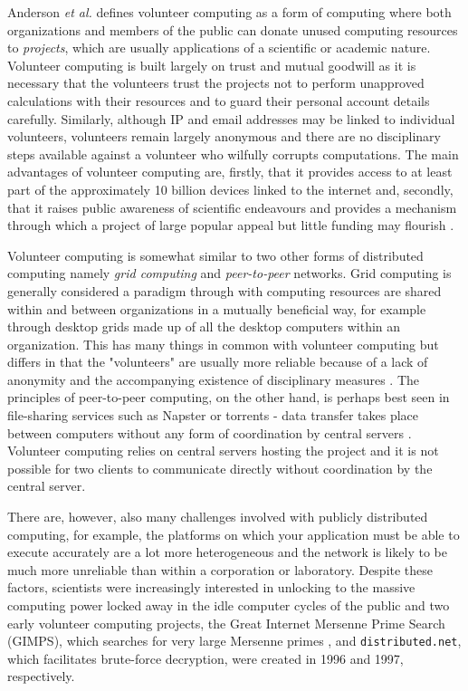 Anderson \emph{et al.} \cite{boincwiki} defines volunteer computing as a form of computing where both organizations and members of the public can donate unused computing resources to \emph{projects}, which are usually applications of a scientific or academic nature. Volunteer computing is built largely on trust and mutual goodwill as it is necessary that the volunteers trust the projects not to perform unapproved calculations with their resources and to guard their personal account details carefully. Similarly, although IP and email addresses may be linked to individual volunteers, volunteers remain largely anonymous and there are no disciplinary steps available against a volunteer who wilfully corrupts computations. The main advantages of volunteer computing are, firstly, that it provides access to at least part of the approximately 10 billion devices linked to the internet \cite{anderson2013,cisco} and, secondly, that it raises public awareness of scientific endeavours and provides a mechanism through which a project of large popular appeal but little funding may flourish \cite{boincwiki}.

Volunteer computing is somewhat similar to two other forms of distributed computing namely \emph{grid computing} and \emph{peer-to-peer} networks. Grid computing is generally considered a paradigm through with computing resources are shared within and between organizations in a mutually beneficial way, for example through desktop grids made up of  all the desktop computers within an organization. This has many things in common with volunteer computing but differs in that the "volunteers" are usually more reliable because of a lack of anonymity and the accompanying existence of disciplinary measures \cite{boincwiki, fostergrid}. The principles of peer-to-peer computing, on the other hand, is  perhaps best seen in file-sharing services such as Napster or torrents - data transfer takes place between computers without any form of coordination by central servers \cite{peer, peer2}. Volunteer computing relies on central servers hosting the project and it is not possible for two clients to communicate directly without coordination by the central server.  

There are, however, also many challenges involved with publicly distributed computing, for example, the platforms on which your application must be able to execute accurately are a lot more heterogeneous  and the network is likely to be much more unreliable than within a corporation or laboratory.   Despite these factors, scientists were increasingly interested in unlocking to the massive computing power locked away in the idle computer cycles of the public and two early volunteer computing projects, the Great Internet Mersenne Prime Search (GIMPS), which searches for very large Mersenne primes \cite{gimps}, and \texttt{distributed.net}, which facilitates brute-force decryption, were created in 1996 and 1997, respectively. 

